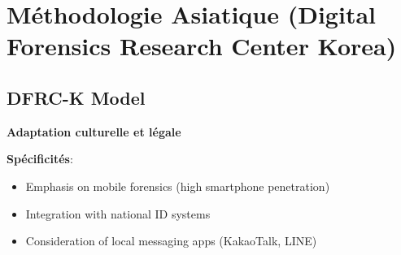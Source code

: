 \section{Méthodologie Asiatique (Digital Forensics Research Center Korea)}
\subsection{DFRC-K Model}
\textbf{Adaptation culturelle et légale}

\textbf{Spécificités}:

\begin{itemize}
\item Emphasis on mobile forensics (high smartphone penetration)
\item Integration with national ID systems
\item Consideration of local messaging apps (KakaoTalk, LINE)
\end{itemize}